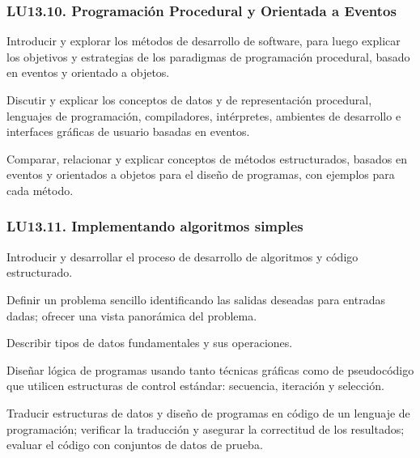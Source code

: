 \subsubsection{LU13.10. Programación Procedural y Orientada a Eventos}\label{sec:LU13.10}
\begin{LearningUnit}
\begin{LUGoal}
\item Introducir y explorar los métodos de desarrollo de software, para luego explicar los objetivos y estrategias de los paradigmas de programación procedural, basado en eventos y orientado a objetos.
\end{LUGoal}

\begin{LUObjective}
\item Discutir y explicar los conceptos de datos y de representación procedural, lenguajes de programación, compiladores, intérpretes, ambientes de desarrollo e interfaces gráficas de usuario basadas en eventos.
\item Comparar, relacionar y explicar conceptos de métodos estructurados, basados en eventos y orientados a objetos para el diseño de programas, con ejemplos para cada método.
\end{LUObjective}
\end{LearningUnit}

\subsubsection{LU13.11. Implementando algoritmos simples}\label{sec:LU13.11}
\begin{LearningUnit}
\begin{LUGoal}
\item Introducir y desarrollar el proceso de desarrollo de algoritmos y código estructurado.
\end{LUGoal}

\begin{LUObjective}
\item Definir un problema sencillo identificando las salidas deseadas para entradas dadas; ofrecer una vista panorámica del problema.
\item Describir tipos de datos fundamentales y sus operaciones.
\item Diseñar lógica de programas usando tanto técnicas gráficas como de pseudocódigo que utilicen estructuras de control estándar: secuencia, iteración y selección.
\item Traducir estructuras de datos y diseño de programas en código de un lenguaje de programación; verificar la traducción y asegurar la correctitud de los resultados; evaluar el código con conjuntos de datos de prueba.
\end{LUObjective}
\end{LearningUnit}

